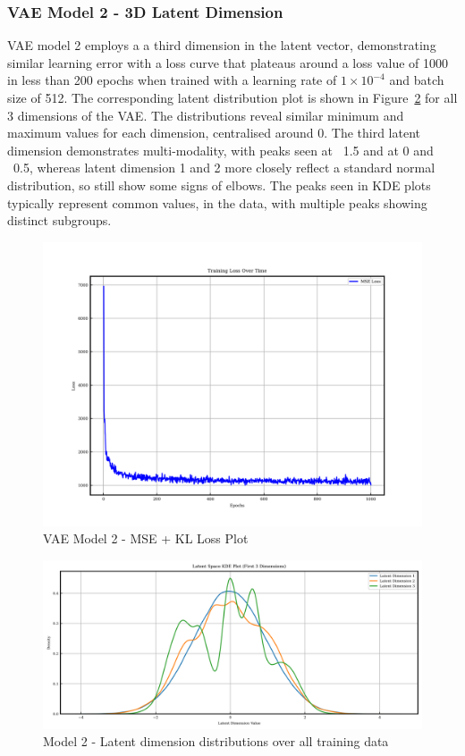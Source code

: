 \documentclass{article}
\begin{document}
\subsubsection{VAE Model 2 - 3D Latent Dimension}
VAE model 2 employs a a third dimension in the latent vector, demonstrating similar learning error with a loss curve that plateaus around a loss value of 1000 in less than 200 epochs when trained with a learning rate of $1\times10^{-4}$ and batch size of 512.  The corresponding latent distribution plot is shown in Figure~\ref{fig:model2_latent_dist} for all 3 dimensions of the VAE. The distributions reveal similar minimum and maximum values for each dimension, centralised around 0. The third latent dimension demonstrates multi-modality, with peaks seen at ~1.5 and at 0 and ~0.5, whereas latent dimension 1 and 2 more closely reflect a standard normal distribution, so still show some signs of elbows. The peaks seen in KDE plots typically represent common values, in the data, with multiple peaks showing distinct subgroups.

\begin{figure}[H]
\centering
    \includegraphics[width=0.75\linewidth]{figures/VAEmodels/model2/loss_plot.png}
    \caption{VAE Model 2 - MSE + KL Loss Plot}
    \label{fig:model2_loss_plot}
\end{figure}

\begin{figure}[H]
    \centering
    \includegraphics[width=0.75\linewidth]{figures/VAEmodels/model2/latent_distribution.png}
    \caption{Model 2 - Latent dimension distributions over all training data}
    \label{fig:model2_latent_dist}
\end{figure}
\end{document}
